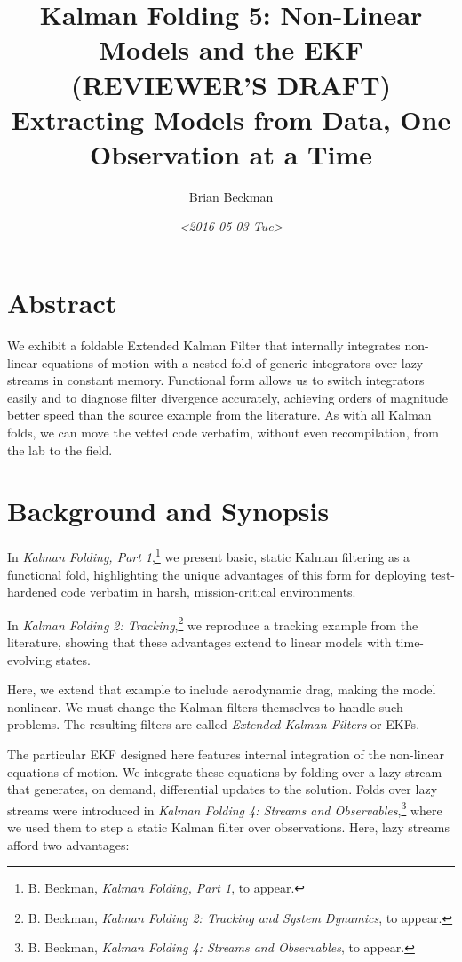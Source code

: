 \documentclass[10pt,oneside,x11names]{article}
\author{Brian Beckman}
\date{\textit{<2016-05-03 Tue>}}
\title{Kalman Folding 5: Non-Linear Models and the EKF (REVIEWER'S DRAFT)\\\medskip
\large Extracting Models from Data, One Observation at a Time}
\begin{document}
\maketitle
\setcounter{tocdepth}{2}
\tableofcontents


\section{Abstract}
\label{sec:orgheadline1}

We exhibit a foldable Extended Kalman Filter that internally integrates
non-linear equations of motion with a nested fold of generic
integrators over lazy streams in constant memory.
Functional form allows us to switch integrators easily and to diagnose filter
divergence accurately, achieving orders of magnitude better speed than
the source example from the literature. As with all Kalman folds, we can move
the vetted code verbatim, without even recompilation, from the lab to the field.

\section{Background and Synopsis}
\label{sec:orgheadline2}

In \emph{Kalman Folding, Part 1},\footnote{B. Beckman, \emph{Kalman Folding, Part 1}, to appear.} we present basic, static Kalman filtering
as a functional fold, highlighting the unique advantages of this form for
deploying test-hardened code verbatim in harsh, mission-critical environments.

In \emph{Kalman Folding 2: Tracking},\footnote{B. Beckman, \emph{Kalman Folding 2: Tracking and System Dynamics}, to appear.} we reproduce a tracking example from
the literature, showing that these advantages extend to linear
models with time-evolving states. 

Here, we extend that example to include aerodynamic drag, making the model
nonlinear. We must change the Kalman filters themselves to handle such problems.
The resulting filters are called \emph{Extended Kalman Filters} or EKFs.

The particular EKF designed here features internal integration of the non-linear
equations of motion. We integrate these equations by folding over a lazy stream
that generates, on demand, differential updates to the solution. Folds over lazy
streams were introduced in \emph{Kalman Folding 4: Streams and Observables},\footnote{B. Beckman, \emph{Kalman Folding 4: Streams and Observables}, to appear.}
where we used them to step a static Kalman filter over observations. Here,
lazy streams afford two advantages:
\end{document}
